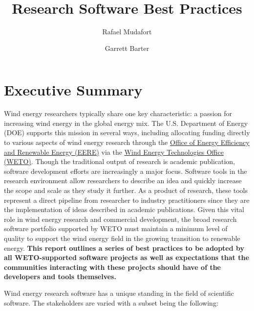 \documentclass[]{nlr}
\title{Research Software Best Practices}
\author{Rafael Mudafort} %
\author{Garrett Barter} %
\affil{National Renewable Energy Laboratory}
\begin{document}
\frontmatter


\chapter{Executive Summary}

Wind energy researchers typically share one key characteristic: a passion for increasing
wind energy in the global energy mix. The U.S. Department of Energy (DOE) supports this mission
in several ways, including allocating funding directly to various aspects of wind energy
research through the
\href{https://www.energy.gov/eere/office-energy-efficiency-renewable-energy}{Office of Energy Efficiency and Renewable Energy (EERE)}
via the
\href{https://www.energy.gov/eere/wind/wind-energy-technologies-office}{Wind Energy Technologies Office (WETO)}.
Though the traditional output of research is academic publication, software development efforts
are increasingly a major focus. Software tools in the research environment allow researchers to
describe an idea and quickly increase the scope and scale as they study it further.
As a product of research, these tools represent a direct pipeline from researcher to industry
practitioners since they are the implementation of ideas described in academic publications.
Given this vital role in wind energy research and commercial development, the broad research software portfolio supported by WETO must maintain a minimum level of quality to support the wind energy field in the growing transition to renewable energy. \textbf{This report outlines a series of best practices to be adopted by all WETO-supported software projects as well as expectations that the communities interacting with these projects should have of the developers and tools themselves.}

Wind energy research software has a unique standing in the field of scientific software. The
stakeholders are varied with a subset being the following:
\end{document}
